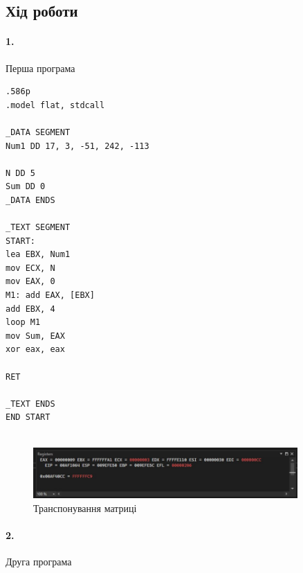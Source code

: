 \documentclass[12pt]{extarticle}
\begin{document}
\subsection*{Хід роботи}
\paragraph{1.}Перша програма

\begin{verbatim}
.586p
.model flat, stdcall

_DATA SEGMENT
Num1 DD 17, 3, -51, 242, -113 

N DD 5 
Sum DD 0 
_DATA ENDS

_TEXT SEGMENT
START:
lea EBX, Num1 
mov ECX, N 
mov EAX, 0 
M1: add EAX, [EBX] 
add EBX, 4 
loop M1 
mov Sum, EAX 
xor eax, eax

RET 

_TEXT ENDS
END START


\end{verbatim}

\begin{figure}[H]
    \centering
    \includegraphics[width=0.90\textwidth]{iter2.jpg}
    \caption{Транспонування матриці}
\end{figure}

\paragraph{2.}Друга програма
\end{document}
